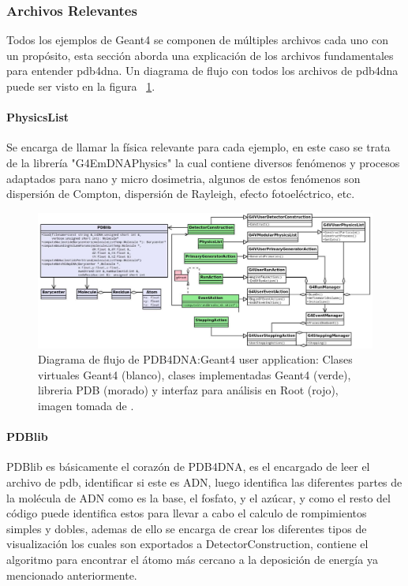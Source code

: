 \subsubsection{Archivos Relevantes}
Todos los ejemplos de Geant4 se componen de múltiples archivos cada uno con un propósito, esta sección aborda una explicación de los archivos fundamentales para entender pdb4dna. Un diagrama de flujo con todos los archivos de pdb4dna puede ser visto en la figura ~\ref{fig:UoC}.

\paragraph{PhysicsList}
Se encarga de llamar la física relevante para cada ejemplo, en este caso se trata de la librería "G4EmDNAPhysics" la cual contiene diversos fenómenos y procesos adaptados para nano y micro dosimetria, algunos de estos fenómenos son dispersión de Compton, dispersión de Rayleigh, efecto fotoeléctrico, etc.

\begin{figure}[htbp]
    \centering
    \includegraphics[width=1\linewidth]{./Figures/flujo.png}
    \caption[Diagrama de flujo de PDB4DNA]{Diagrama de flujo de PDB4DNA:Geant4 user application: Clases virtuales Geant4  (blanco), clases implementadas Geant4 (verde), libreria PDB (morado) y interfaz para análisis en Root (rojo), imagen tomada de \cite{pdblib}.}
    \label{fig:UoC}
\end{figure}

\paragraph{PDBlib}

PDBlib es básicamente el corazón de PDB4DNA, es el encargado de leer el archivo de pdb, identificar si este es ADN, luego identifica las diferentes partes de la molécula de ADN como es la base, el fosfato, y el azúcar, y como el resto del código puede identifica estos para llevar a cabo el calculo de rompimientos simples y dobles, ademas de ello se encarga de crear los diferentes tipos de visualización los cuales son exportados a DetectorConstruction, contiene el algoritmo para encontrar el átomo más cercano a la deposición de energía ya mencionado anteriormente.



